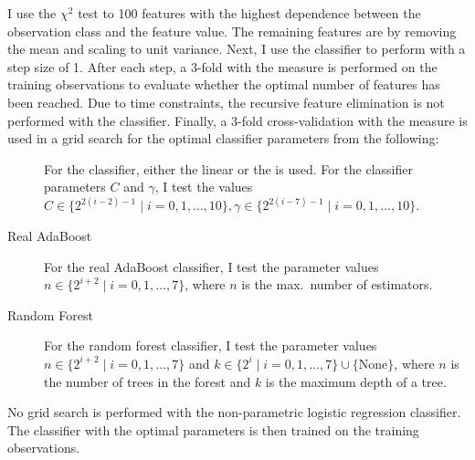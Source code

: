 \begin{description}
    I use the $\chi^2$ test to  100 features with the highest
    dependence between the observation class and the feature value. The
    remaining features are  by removing the mean and scaling
    to unit variance. Next, I use the classifier to perform  with a step size of 1. After each step, a 3-fold
     with the  measure is performed on the
    training observations to evaluate whether the optimal number of features
    has been reached. Due to time constraints, the recursive feature
    elimination is not performed with the  classifier.  Finally, a
    3-fold cross-validation with the  measure is used in a grid
    search for the optimal classifier parameters from the following:
    \begin{description}
      \item[]
        For the  classifier, either the linear or the   is used. For the classifier
        parameters $C$ and $\gamma$, I test the values $C\in\{2^{2(i-2)-1}\mid
        i=0,1,\ldots,10\}, \gamma\in\{2^{2(i-7)-1}\mid i=0,1,\ldots,10\}$.
      \item[Real AdaBoost]
        For the real AdaBoost classifier, I test the parameter values
        $n\in\{2^{i+2}\mid i=0,1,\ldots,7\}$, where $n$ is the max.\ number
        of estimators.
      \item[Random Forest]
        For the random forest classifier, I test the parameter values
        $n\in\{2^{i+2}\mid i=0,1,\ldots,7\}$ and
        $k\in\{2^i\mid i=0,1,\ldots,7\}\cup\{\text{None}\}$,
        where $n$ is the number of trees in the forest and $k$ is the maximum
        depth of a tree.
    \end{description}
    No grid search is performed with the non-parametric logistic regression
    classifier. The classifier with the optimal parameters is then trained on
    the training observations.
\end{description}

